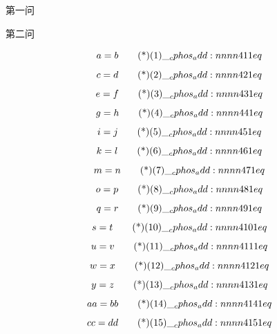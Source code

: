 \documentclass[answer]{cphos}
\begin{document}
\begin{problem}[30]{}

\begin{problemstatement}
 第一问

 第二问
\end{problemstatement}

\begin{solution}
\begin{equation}
    a = b \eqtagscore{1}{1}
\end{equation}
\begin{equation}
    c = d \eqtagscore{2}{1}
\end{equation}
\begin{equation}
    e = f \eqtagscore{3}{1}
\end{equation}
\begin{equation}
    g = h \eqtagscore{4}{1}
\end{equation}
\begin{equation}
    i = j \eqtagscore{5}{1}
\end{equation}
\begin{equation}
    k = l \eqtagscore{6}{1}
\end{equation}
\begin{equation}
    m = n \eqtagscore{7}{1}
\end{equation}
\begin{equation}
    o = p \eqtagscore{8}{1}
\end{equation}
\begin{equation}
    q = r \eqtagscore{9}{1}
\end{equation}
\begin{equation}
    s = t \eqtagscore{10}{1}
\end{equation}
\begin{equation}
    u = v \eqtagscore{11}{1}
\end{equation}
\begin{equation}
    w = x \eqtagscore{12}{1}
\end{equation}
\begin{equation}
    y = z \eqtagscore{13}{1}
\end{equation}
\begin{equation}
    aa = bb \eqtagscore{14}{1}
\end{equation}
\begin{equation}
    cc = dd \eqtagscore{15}{1}
\end{equation}


\end{solution}
\end{problem}
\end{document}
